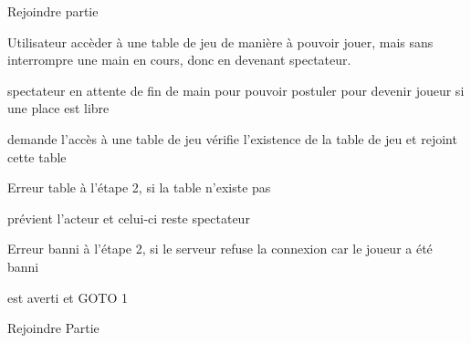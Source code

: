 \begin{usecase}{Rejoindre partie}
	
	\begin{presentation}
		\actor Utilisateur
		\goal accèder à une table de jeu de manière à pouvoir jouer, mais sans 
		      interrompre une main en cours, donc en devenant spectateur.
		
		\begin{precondition}
			\aucune
		\end{precondition}
		
		\begin{postcondition}
			\condition spectateur
			\condition en attente de fin de main pour pouvoir postuler pour 
			           devenir joueur si une place est libre
		\end{postcondition}
		
		\begin{includeuc}
				\aucun
		\end{includeuc}
		
	\end{presentation}

	\begin{scenario}
		\start demande l'accès à une table de jeu
		\system vérifie l'existence de la table de jeu et rejoint cette table
	\end{scenario}

	\begin{alternative}
		\nomalt Erreur table
		\condition à l'étape 2, si la table n'existe pas

		\begin{alt}
			\system prévient l'acteur et celui-ci reste spectateur
		\end{alt}

		\nomalt Erreur banni
		\condition à l'étape 2, si le serveur refuse la connexion car le 
		joueur a été banni

		\begin{alt}
			\user est averti et GOTO 1
		\end{alt}

	\end{alternative}
	
	                {Rejoindre Partie}
	
\end{usecase}



